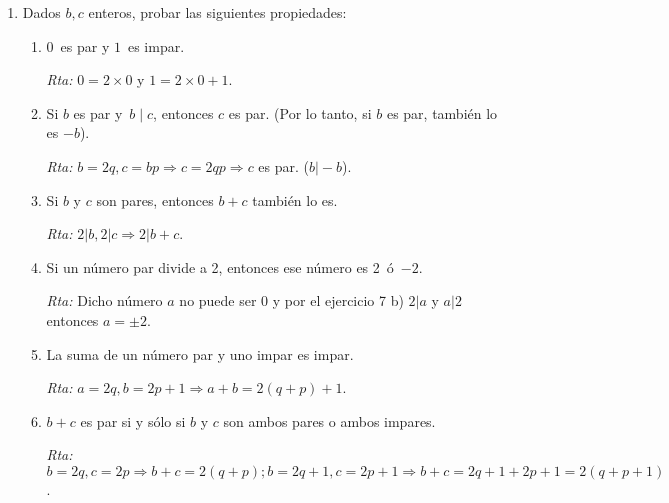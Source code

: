 \documentclass[a4paper,12pt,twoside,spanish,reqno]{amsbook}
\numberwithin{equation}{section}
\newcommand{\rta}{\noindent\textit{Rta: }}
\begin{document}
\begin{enumerate}
\begin{enumerate}
    \rta Como $b=aq$ y $c=ap$, $b\pm c=a(q\pm p)$.
    
    \item Si $a \neq 0$, $a | b$\, y \,$a | (b+c)$, entonces \,$a | c$.
    
    \rta Se puede usar el inciso anterior con $b=0$.
    
    \item Si $a \neq 0$\, y \,$a | b$, entonces \,$a| b\cdot c$.
    
    \rta Si $b=aq$ entonces $b.c=aqc \Rightarrow a\vert b.c$.
\end{enumerate}



\item Dados $b,c$ enteros, probar las siguientes propiedades:
\begin{enumerate}
    \item  $0$\, es par y $1$\, es impar.
    
    \rta $0=2\times 0$ y $1=2\times 0+1$.
    
    \item  Si $b$ es par y \,$b \mid c$, entonces $c$ es par.  (Por lo tanto, si $b$ es par, tambi\'en lo es $-b$).
    
    \rta $b=2q, c=bp\Rightarrow c=2qp \Rightarrow c$ es par. ($b\vert -b$).
    
    \item  Si $b$ y $c$ son pares, entonces $b+c$ tambi\'en lo es. %
    
    \rta $2\vert b, 2\vert c \Rightarrow 2\vert b+c$.
    
    \item  Si un número par divide a 2, entonces ese número es 2\, \'o \,$-2$.
    
    \rta Dicho número $a$ no puede ser 0 y por el ejercicio 7 b) $2\vert a$ y $a\vert 2$ entonces $a= \pm2$.
    
    \item  La suma de un número par y uno impar es impar.
    
    \rta $a=2q, b=2p+1 \Rightarrow a+b=2(q+p)+1$.
    
    \item $b + c$ es par si y  sólo si $b$ y $c$ son ambos pares o ambos impares.
    
    \rta $b=2q, c=2p \Rightarrow b+c=2(q+p); b=2q+1, c=2p+1\Rightarrow b+c=2q+1+2p+1=2(q+p+1)$.
\end{enumerate}




\end{enumerate}
\end{document}
